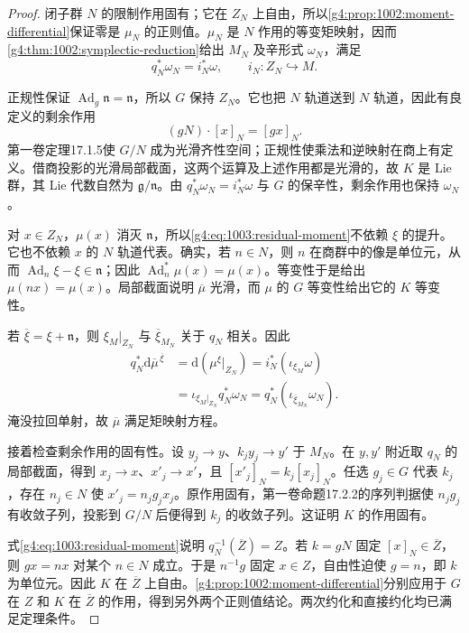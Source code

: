 \begin{proof}
	闭子群 \(N\) 的限制作用固有；它在 \(Z_N\) 上自由，所以\cref{g4:prop:1002:moment-differential}保证零是 \(\mu_N\) 的正则值。\(\mu_N\) 是 \(N\) 作用的等变矩映射，因而\cref{g4:thm:1002:symplectic-reduction}给出 \(M_N\) 及辛形式 \(\omega_N\)，满足
	\[
		q_N^*\omega_N=i_N^*\omega,\qquad i_N:Z_N\hookrightarrow M.
	\]

	正规性保证 \(\operatorname{Ad}_g\mathfrak n=\mathfrak n\)，所以 \(G\) 保持 \(Z_N\)。它也把 \(N\) 轨道送到 \(N\) 轨道，因此有良定义的剩余作用
	\[
		(gN)\cdot[x]_N=[gx]_N.
	\]
	第一卷定理17.1.5使 \(G/N\) 成为光滑齐性空间；正规性使乘法和逆映射在商上有定义。借商投影的光滑局部截面，这两个运算及上述作用都是光滑的，故 \(K\) 是 Lie 群，其 Lie 代数自然为 \(\mathfrak g/\mathfrak n\)。由 \(q_N^*\omega_N=i_N^*\omega\) 与 \(G\) 的保辛性，剩余作用也保持 \(\omega_N\)。

	对 \(x\in Z_N\)，\(\mu(x)\) 消灭 \(\mathfrak n\)，所以\eqref{g4:eq:1003:residual-moment}不依赖 \(\xi\) 的提升。它也不依赖 \(x\) 的 \(N\) 轨道代表。确实，若 \(n\in N\)，则 \(n\) 在商群中的像是单位元，从而 \(\operatorname{Ad}_n\xi-\xi\in\mathfrak n\)；因此 \(\operatorname{Ad}_n^*\mu(x)=\mu(x)\)。等变性于是给出 \(\mu(nx)=\mu(x)\)。局部截面说明 \(\overline\mu\) 光滑，而 \(\mu\) 的 \(G\) 等变性给出它的 \(K\) 等变性。

	若 \(\overline\xi=\xi+\mathfrak n\)，则 \(\xi_M|_{Z_N}\) 与 \(\overline\xi_{M_N}\) 关于 \(q_N\) 相关。因此
	\[
		\begin{aligned}
			q_N^*\mathrm{d}\overline\mu^{\,\overline\xi}
			&=\mathrm{d}(\mu^\xi|_{Z_N})
			=i_N^*(\iota_{\xi_M}\omega)\\
			&=\iota_{\xi_M|_{Z_N}}q_N^*\omega_N
			=q_N^*(\iota_{\overline\xi_{M_N}}\omega_N).
		\end{aligned}
	\]
	淹没拉回单射，故 \(\overline\mu\) 满足矩映射方程。

	接着检查剩余作用的固有性。设 \(y_j\to y\)、\(k_jy_j\to y'\) 于 \(M_N\)。在 \(y,y'\) 附近取 \(q_N\) 的局部截面，得到 \(x_j\to x\)、\(x'_j\to x'\)，且 \([x'_j]_N=k_j[x_j]_N\)。任选 \(g_j\in G\) 代表 \(k_j\)，存在 \(n_j\in N\) 使 \(x'_j=n_jg_jx_j\)。原作用固有，第一卷命题17.2.2的序列判据使 \(n_jg_j\) 有收敛子列，投影到 \(G/N\) 后便得到 \(k_j\) 的收敛子列。这证明 \(K\) 的作用固有。

	式\eqref{g4:eq:1003:residual-moment}说明
	\(q_N^{-1}(\overline Z)=Z\)。若 \(k=gN\) 固定 \([x]_N\in\overline Z\)，则 \(gx=nx\) 对某个 \(n\in N\) 成立。于是 \(n^{-1}g\) 固定 \(x\in Z\)，自由性迫使 \(g=n\)，即 \(k\) 为单位元。因此 \(K\) 在 \(\overline Z\) 上自由。\cref{g4:prop:1002:moment-differential}分别应用于 \(G\) 在 \(Z\) 和 \(K\) 在 \(\overline Z\) 的作用，得到另外两个正则值结论。两次约化和直接约化均已满足定理条件。


\end{proof}
